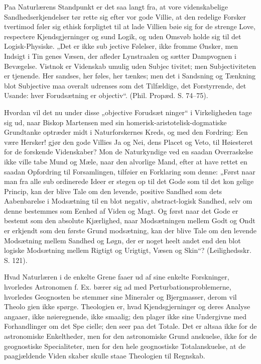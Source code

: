 \documentclass[12pt]{book}
\newcommand{\opage}[1]{\marginnote{\footnotesize\textit{[#1]}}}
\begin{document}
Paa Naturlærens Standpunkt er det saa langt fra, at
vore videnskabelige Sandhedserkjendelser tør rette sig efter
vor gode Villie, at den redelige Forsker tvertimod føler sig
ethisk forpligtet til at lade Villien bøie sig for de strenge
Love, respectere Kjendsgjerninger og sund Logik, og uden
Omsvøb holde sig til det Logisk-Physiske. „Det er ikke sub\-%
jective Følelser, ikke fromme Ønsker, men Indsigt i Tin\-%
genes Væsen, der afleder Lynstraalen og sætter Dampvognen
\opage{12}\setcounter{footnote}{0}%
i Bevægelse. Vistnok er Videnskab umulig uden Subjec\-%
tivitet; men Subjectiviteten er tjenende. Her sandses, her
føles, her tænkes; men det i Sandsning og Tænkning blot
Subjective maa overalt udrenses som det Tilfældige, det
Forstyrrende, det Usande: hver Forudsætning er objectiv“.
(Phil. Propæd. S. 74--75).

Hvordan vil det nu under disse „objective Forudsæt\-%
ninger“ i Virkeligheden tage sig ud, naar Biskop Martensen
med sin homerisk-aristotelisk-dogmatiske Grundtanke optræder
midt i Naturforskernes Kreds, og med den Fordring: Een
være Hersker! gjør den gode Villies Ja og Nei, dens Placet
og Veto, til Høiesteret for de forskende Videnskaber? Mon
de Naturkyndige ved en saadan Overraskelse ikke ville tabe
Mund og Mæle, naar den alvorlige Mand, efter at
have rettet en saadan Opfordring til Forsamlingen, tilføier
en Forklaring som denne: „Først naar man fra alle sub\-%
ordinerede Ideer er stegen op til det Gode som til det kon\-%
gelige Princip, kan der blive Tale om den levende, positive
Sandhed som dets Aabenbarelse i Modsætning til en blot
negativ, abstract-logisk Sandhed, selv om denne bestemmes
som Eenhed af Viden og Magt. Og først naar det Gode
er bestemt som den absolute Kjærlighed, naar Modsætningen
mellem Godt og Ondt er erkjendt som den første Grund\-%
modsætning, kan der blive Tale om den levende Modsætning
mellem Sandhed og Løgn, der er noget heelt andet end den
blot logiske Modsætning mellem Rigtigt og Urigtigt, Væsen
og Skin“? (Leilighedsskr. S. 121).

Hvad Naturlæren i de enkelte Grene faaer ud af sine
enkelte Forskninger, hvorledes Astronomen f. Ex. bærer sig
ad med Perturbationsproblemerne, hvorledes Geognosten be\-%
stemmer sine Mineraler og Bjergmasser, derom vil Theolo\-%
gien ikke spørge. Theologien er, hvad Kjendsgjerninger og
deres Analyse angaaer, ikke nøieregnende, ikke smaalig; den
plager ikke sine Undergivne med Forhandlinger om det Spe\-%
\opage{13}\setcounter{footnote}{0}%
cielle; den seer paa det Totale. Det er altsaa ikke for de
astronomiske Enkeltheder, men for den astronomiske Grund\-%
anskuelse, ikke for de geognostiske Specialiteter, men for den
hele geognostiske Totalanskuelse, at de paagjældende Viden\-%
skaber skulle staae Theologien til Regnskab.
\end{document}
